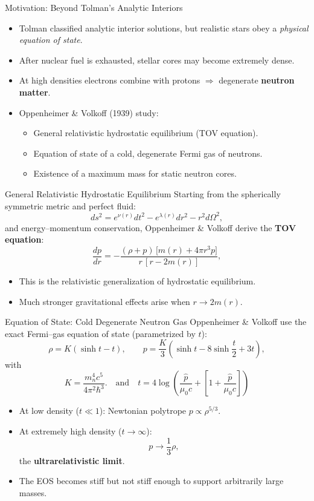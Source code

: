 \documentclass[11pt]{beamer}
\begin{document}
\begin{frame}{Motivation: Beyond Tolman's Analytic Interiors}
  \begin{itemize}
    \item Tolman classified analytic interior solutions, but realistic stars obey a \emph{physical equation of state}.
    \item After nuclear fuel is exhausted, stellar cores may become extremely dense.
    \item At high densities electrons combine with protons $\Rightarrow$ degenerate \textbf{neutron matter}.
    \item Oppenheimer \& Volkoff (1939) study:
      \begin{itemize}
        \item General relativistic hydrostatic equilibrium (TOV equation).
        \item Equation of state of a cold, degenerate Fermi gas of neutrons.
        \item Existence of a maximum mass for static neutron cores.
      \end{itemize}
  \end{itemize}
\end{frame}

\begin{frame}{General Relativistic Hydrostatic Equilibrium}
  Starting from the spherically symmetric metric and perfect fluid:
  \[
    ds^2 = e^{\nu(r)} dt^2 - e^{\lambda(r)} dr^2 - r^2 d\Omega^2 ,
  \]
  and energy–momentum conservation, Oppenheimer \& Volkoff derive the
  \textbf{TOV equation}:
  \[
    \frac{dp}{dr}
    = -\frac{(\rho + p)\,\big[m(r) + 4\pi r^3 p\big]}
            {r\,[r - 2m(r)]},
  \]
  \begin{itemize}
    \item This is the relativistic generalization of hydrostatic equilibrium.
    \item Much stronger gravitational effects arise when $r \to 2m(r)$.
  \end{itemize}
\end{frame}

\begin{frame}{Equation of State: Cold Degenerate Neutron Gas}
  \small
  Oppenheimer \& Volkoff use the exact Fermi–gas equation of state
  (parametrized by $t$):
  \[
    \rho = K(\sinh t - t), \qquad
    p = \frac{K}{3}\left(\sinh t - 8 \sinh\frac{t}{2} + 3t\right),
  \]
  with
  \[
    K = \frac{m_n^4 c^5}{4\pi^2\hbar^3}. \quad \text{and} \quad t = 4 \log \left( \frac{\hat{p}}{\mu_0 c} + \left[ 1 + \frac{\hat{p}}{\mu_0 c} \right] \right)
  \]
  \begin{itemize}
    \item At low density ($t \ll 1$): Newtonian polytrope $p \propto \rho^{5/3}$.
    \item At extremely high density ($t \to \infty$):
      \[
        p \to \frac{1}{3}\rho,
      \]
      the \textbf{ultrarelativistic limit}.
    \item The EOS becomes stiff but not stiff enough to support arbitrarily large masses.
  \end{itemize}
\end{frame}
\end{document}
